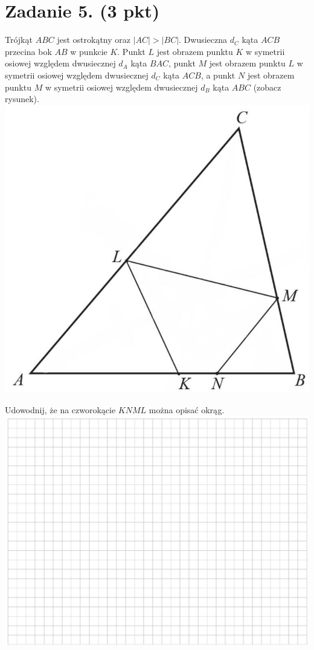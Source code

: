 \documentclass[10pt]{article}
\begin{document}
\section*{Zadanie 5. (3 pkt)}
Trójkąt \(A B C\) jest ostrokątny oraz \(|A C|>|B C|\). Dwusieczna \(d_{C}\) kąta \(A C B\) przecina bok \(A B\) w punkcie \(K\). Punkt \(L\) jest obrazem punktu \(K\) w symetrii osiowej względem dwusiecznej \(d_{A}\) kąta \(B A C\), punkt \(M\) jest obrazem punktu \(L\) w symetrii osiowej względem dwusiecznej \(d_{C}\) kąta \(A C B\), a punkt \(N\) jest obrazem punktu \(M\) w symetrii osiowej względem dwusiecznej \(d_{B}\) kąta \(A B C\) (zobacz rysunek).\\
\includegraphics[max width=\textwidth, center]{2024_11_21_7379bf55d75dd0fc4c58g-10}

Udowodnij, że na czworokącie \(K N M L\) można opisać okrąg.\\
\includegraphics[max width=\textwidth, center]{2024_11_21_7379bf55d75dd0fc4c58g-10(1)}
\end{document}
